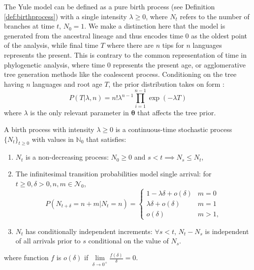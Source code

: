The Yule model \cite{Yule1925} can be defined as a pure birth process (see Definition \ref{def:birthprocess}) with a single intensity $\lambda \geq 0$, where $N_t$ refers to the number of branches at time $t$, $N_0 = 1$. We make a distinction here that the model is generated from the ancestral lineage and thus encodes time $0$ as the oldest point of the analysis, while final time $T$ where there are $n$ tips for $n$ languages represents the present. This is contrary to the common representation of time in phylogenetic analysis, where time $0$ represents the present age, or agglomerative tree generation methods like the coalescent process. Conditioning on the tree having $n$ languages and root age $T$, the prior distribution takes on form \cite{Gernhard2008}:
\begin{equation}
\label{eq:yuleprior}
    P(T | \lambda, n) = n! \lambda^{n-1}\prod_{i=1}^{n-1}\exp(-\lambda T)
\end{equation}
where $\lambda$ is the only relevant parameter in $\boldsymbol{\theta}$ that affects the tree prior.

\begin{definition} 
\label{def:birthprocess}
A birth process with intensity $\lambda \geq 0$ is a continuous-time stochastic process $\{N_t\}_{t \geq 0}$ with values in $\mathbb{N}_0$ that satisfies:
\begin{enumerate}
    \item $N_t$ is a non-decreasing process: $N_0 \geq 0$ and $s < t \implies N_s \leq N_t$,
    \item The infinitesimal transition probabilities model single arrival: for $t \geq 0, \delta > 0, n, m \in \mathcal{N}_0$,
    \begin{equation}
        P(N_{t + \delta} = n + m | N_t = n) = \begin{cases}
            1 - \lambda \delta + o(\delta) & m = 0 \\
            \lambda \delta + o(\delta) & m = 1 \\
            o(\delta) & m > 1,
        \end{cases}
    \end{equation}
    \item $N_t$ has conditionally independent increments: $\forall s < t$, $N_t - N_s$ is independent of all arrivals prior to $s$ conditional on the value of $N_s$.
\end{enumerate}
where function $f$ is $o(\delta)$ if $\lim\limits_{\delta \to 0^+} \frac{f(\delta)}{\delta} = 0$.
\end{definition}

